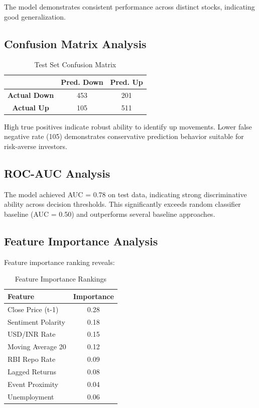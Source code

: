 \documentclass[conference]{IEEEtran}
\begin{document}
The model demonstrates consistent performance across distinct stocks, indicating good generalization.

\subsection{Confusion Matrix Analysis}

\begin{table}[h]
\centering
\small
\begin{tabular}{c|cc}
& \textbf{Pred. Down} & \textbf{Pred. Up} \\
\midrule
\textbf{Actual Down} & 453 & 201 \\
\textbf{Actual Up} & 105 & 511 \\
\end{tabular}
\caption{Test Set Confusion Matrix}
\label{tab:confusion}
\end{table}

High true positives indicate robust ability to identify up movements. Lower false negative rate (105) demonstrates conservative prediction behavior suitable for risk-averse investors.

\subsection{ROC-AUC Analysis}

The model achieved AUC = 0.78 on test data, indicating strong discriminative ability across decision thresholds. This significantly exceeds random classifier baseline (AUC = 0.50) and outperforms several baseline approaches.

\subsection{Feature Importance Analysis}

Feature importance ranking reveals:

\begin{table}[h]
\centering
\small
\setlength{\tabcolsep}{5pt}
\begin{tabular}{lc}
\toprule
\textbf{Feature} & \textbf{Importance} \\
\midrule
Close Price (t-1) & 0.28 \\
Sentiment Polarity & 0.18 \\
USD/INR Rate & 0.15 \\
Moving Average 20 & 0.12 \\
RBI Repo Rate & 0.09 \\
Lagged Returns & 0.08 \\
Event Proximity & 0.04 \\
Unemployment & 0.06 \\
\bottomrule
\end{tabular}
\caption{Feature Importance Rankings}
\label{tab:importance}
\end{table}
\end{document}
